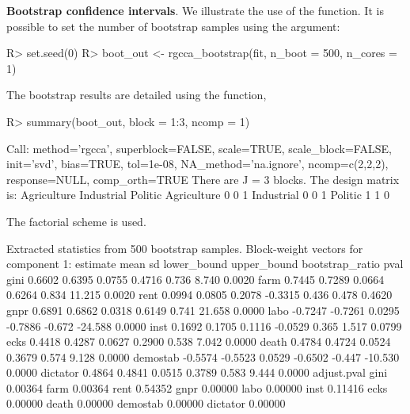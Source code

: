\documentclass[
]{jss}
\begin{document}
\textbf{Bootstrap confidence intervals}. We illustrate the use of the
 function. It is possible to set the number of
bootstrap samples using the  argument:

\footnotesize

\begin{CodeChunk}
\begin{CodeInput}
R> set.seed(0)
R> boot_out <- rgcca_bootstrap(fit, n_boot = 500, n_cores = 1)
\end{CodeInput}
\end{CodeChunk}

\normalsize

The bootstrap results are detailed using the  function,

\footnotesize

\begin{CodeChunk}
\begin{CodeInput}
R> summary(boot_out, block = 1:3, ncomp = 1)
\end{CodeInput}
\begin{CodeOutput}
Call: method='rgcca', superblock=FALSE, scale=TRUE, scale_block=FALSE, init='svd',
bias=TRUE, tol=1e-08, NA_method='na.ignore', ncomp=c(2,2,2), response=NULL,
comp_orth=TRUE 
There are J = 3 blocks.
The design matrix is:
            Agriculture Industrial Politic
Agriculture           0          0       1
Industrial            0          0       1
Politic               1          1       0

The factorial scheme is used.

Extracted statistics from 500 bootstrap samples.
Block-weight vectors for component 1: 
         estimate    mean     sd lower_bound upper_bound bootstrap_ratio   pval
gini       0.6602  0.6395 0.0755      0.4716       0.736           8.740 0.0020
farm       0.7445  0.7289 0.0664      0.6264       0.834          11.215 0.0020
rent       0.0994  0.0805 0.2078     -0.3315       0.436           0.478 0.4620
gnpr       0.6891  0.6862 0.0318      0.6149       0.741          21.658 0.0000
labo      -0.7247 -0.7261 0.0295     -0.7886      -0.672         -24.588 0.0000
inst       0.1692  0.1705 0.1116     -0.0529       0.365           1.517 0.0799
ecks       0.4418  0.4287 0.0627      0.2900       0.538           7.042 0.0000
death      0.4784  0.4724 0.0524      0.3679       0.574           9.128 0.0000
demostab  -0.5574 -0.5523 0.0529     -0.6502      -0.447         -10.530 0.0000
dictator   0.4864  0.4841 0.0515      0.3789       0.583           9.444 0.0000
         adjust.pval
gini         0.00364
farm         0.00364
rent         0.54352
gnpr         0.00000
labo         0.00000
inst         0.11416
ecks         0.00000
death        0.00000
demostab     0.00000
dictator     0.00000
\end{CodeOutput}
\end{CodeChunk}
\end{document}
